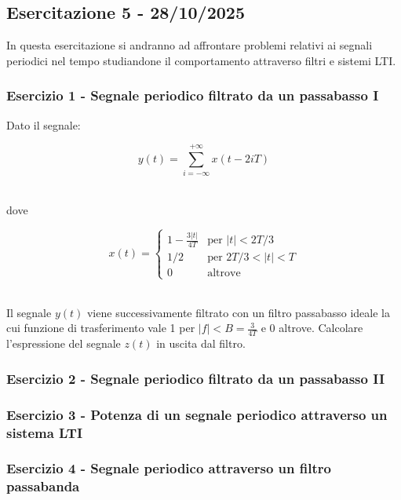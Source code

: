 \documentclass[../main.tex]{subfiles}
\begin{document}
\clearpage
\thispagestyle{empty}
\vspace*{7cm}
\subsection{Esercitazione 5 - 28/10/2025}
\vspace*{1.5cm}



In questa esercitazione si andranno ad affrontare problemi relativi ai segnali periodici nel tempo studiandone il comportamento attraverso filtri e sistemi LTI.


\subsubsection{Esercizio 1 - Segnale periodico filtrato da un passabasso I}

Dato il segnale:

\[y(t) = \sum_{i = -\infty}^{+\infty} x(t - 2iT)\]\

dove

\[ 
x(t) = \begin{cases}
    1 - \frac{3|t|}{4T} & \text{per } |t| < 2T/3 \\
    1/2                 & \text{per } 2T/3 < |t| < T \\
    0                   & \text{altrove}
\end{cases} 
\]\

Il segnale $y(t)$ viene successivamente filtrato con un filtro passabasso ideale la cui funzione di trasferimento vale 1 per $|f| < B = \tfrac{3}{4T}$ e 0 altrove. Calcolare l'espressione del segnale $z(t)$ in uscita dal filtro.


\subsubsection{Esercizio 2 - Segnale periodico filtrato da un passabasso II}

\subsubsection{Esercizio 3 - Potenza di un segnale periodico attraverso un sistema LTI}

\subsubsection{Esercizio 4 - Segnale periodico attraverso un filtro passabanda}
\end{document}
